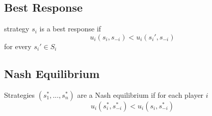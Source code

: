 \documentclass[a4paper] {scrartcl}
\begin{document}
\subsection{Best Response}
strategy $s_i$ is a best response if 
\begin{equation}
	u_i(s_i, s_{-i})<u_i(s_i', s_{-i})
\end{equation}
for every $s_i'\in S_i$


\subsection{Nash Equilibrium}
Strategies $(s_1^*,..., s_n^* )$ are a Nash equilibrium if for each player $i$
\begin{equation}
	u_i(s_i^*, s_{-i}^*)<u_i(s_i, s_{-i}^*)
\end{equation}
\end{document}
